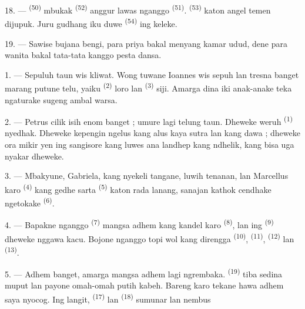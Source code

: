 18. ---  \textsuperscript{(50)} mbukak
 \textsuperscript{(52)} anggur lawas nganggo
 \textsuperscript{(51)}. 
\textsuperscript{(53)} katon angel temen dijupuk. Juru gudhang iku duwe
 \textsuperscript{(54)} ing keleke.

19. --- Sawise bujana bengi, para priya bakal menyang kamar udud, dene
para wanita bakal tata-tata kanggo pesta dansa.

\VUsaut{5.0mm}
\VUsaut{1.6mm}
\VUsaut{2.6mm}

\VUsaut{3.0mm}

1. --- Sepuluh taun wis kliwat. Wong tuwane Ioannes wis sepuh lan
tresna banget marang putune telu, yaiku 
\textsuperscript{(2)} loro lan  \textsuperscript{(3)}
siji. Amarga dina iki  anak-anake teka
ngaturake sugeng ambal warsa.

2. --- Petrus cilik isih enom banget ; umure lagi telung taun. Dheweke
weruh  \textsuperscript{(1)} nyedhak. Dheweke kepengin
ngelus  kang alus kaya sutra lan  kang
dawa ; dheweke ora mikir yen ing sangisore  kang luwes
ana  landhep kang ndhelik, kang bisa uga nyakar dheweke.

3. --- Mbakyune, Gabriela, kang nyekeli tangane, luwih tenanan, lan
Marcellus karo  \textsuperscript{(4)} kang gedhe sarta
 \textsuperscript{(5)} katon rada lanang, sanajan
kathok cendhake ngetokake  \textsuperscript{(6)}.

4. --- Bapakne nganggo  \textsuperscript{(7)} mangsa
adhem kang kandel karo  \textsuperscript{(8)}, lan
ing  \textsuperscript{(9)} dheweke nggawa kacu.
Bojone nganggo topi wol kang direngga 
\textsuperscript{(10)},  \textsuperscript{(11)},
 \textsuperscript{(12)} lan  \textsuperscript{(13)}.

5. --- Adhem banget, amarga mangsa adhem lagi ngrembaka.
 \textsuperscript{(19)} tiba sedina muput lan payone
omah-omah putih kabeh. Bareng karo tekane  hawa adhem
saya nyocog. Ing langit,  \textsuperscript{(17)} lan
 \textsuperscript{(18)} sumunar lan nembus

